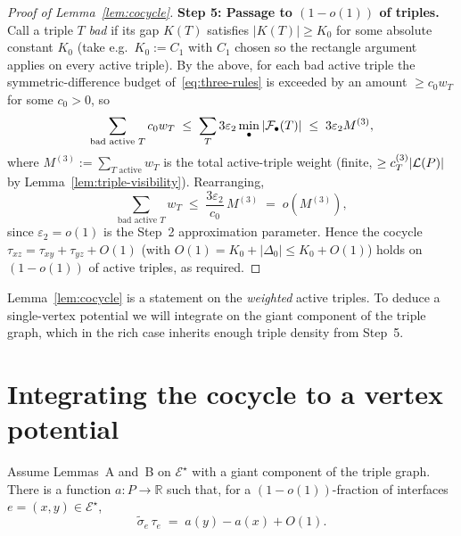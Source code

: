 \begin{proof}[Proof of Lemma~\ref{lem:cocycle}]
\textbf{Step 5: Passage to $(1-o(1))$ of triples.}
Call a triple $T$ \emph{bad} if its gap $K(T)$ satisfies
$|K(T)|\ge K_0$ for some absolute constant $K_0$ (take e.g.\
$K_0:=C_1$ with $C_1$ chosen so the rectangle argument applies on
every active triple).  By the above, for each bad active triple the
symmetric-difference budget of~\eqref{eq:three-rules} is exceeded by
an amount $\ge c_0 w_T$ for some $c_0>0$, so
\[
  \sum_{\text{bad active }T}c_0 w_T
  \;\le\;
  \sum_{T}3\varepsilon_2\min_{\bullet}|\mathcal{F}_{\bullet}(T)|
  \;\le\;3\varepsilon_2 M^{(3)},
\]
where $M^{(3)}:=\sum_{T\text{ active}}w_T$ is the total active-triple
weight (finite, $\ge c_T^{(3)}|\mathcal{L}(P)|$ by
Lemma~\ref{lem:triple-visibility}).  Rearranging,
\[
  \sum_{\text{bad active }T}w_T
  \;\le\;\frac{3\varepsilon_2}{c_0}\,M^{(3)}
  \;=\;o(M^{(3)}),
\]
since $\varepsilon_2=o(1)$ is the Step~2 approximation parameter.
Hence the cocycle $\tau_{xz}=\tau_{xy}+\tau_{yz}+O(1)$ (with
$O(1)=K_0+|\Delta_0|\le K_0+O(1)$) holds on $(1-o(1))$ of active
triples, as required.
\end{proof}

\begin{remark}
Lemma~\ref{lem:cocycle} is a statement on the \emph{weighted} active
triples.  To deduce a single-vertex potential we will integrate on
the giant component of the triple graph, which in the rich case
inherits enough triple density from Step~5.
\end{remark}

\section{Integrating the cocycle to a vertex potential}\label{sec:potential}

\begin{lemma}\label{lem:potential}
\DEP{Lemmas~\ref{lem:sign-consistency}, \ref{lem:cocycle}.}
Assume Lemmas~A and~B on $\mathcal{E}^\star$ with a giant component of
the triple graph.
There is a function $a\colon P\to\mathbb{R}$ such that, for a
$(1-o(1))$-fraction of interfaces $e=(x,y)\in\mathcal{E}^\star$,
\[
  \widetilde\sigma_e \,\tau_e
  \;=\; a(y) - a(x) + O(1).
\]
\end{lemma}

